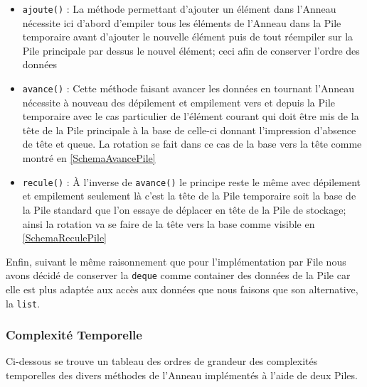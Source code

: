 \documentclass{article}
\newcommand{\info}{\texttt}
\begin{document}
        \begin{itemize}
            \item \info{ajoute()} : La méthode permettant d'ajouter un élément dans l'Anneau nécessite ici d'abord d'empiler tous les éléments de l'Anneau dans la Pile temporaire avant d'ajouter le nouvelle élément puis de tout réempiler sur la Pile principale par dessus le nouvel élément; ceci afin de conserver l'ordre des données
            \item \info{avance()} : Cette méthode faisant avancer les données en tournant l'Anneau nécessite à nouveau des dépilement et empilement vers et depuis la Pile temporaire avec le cas particulier de l'élément courant qui doit être mis de la tête de la Pile principale à la base de celle-ci donnant l'impression d'absence de tête et queue. La rotation se fait dans ce cas de la base vers la tête comme montré en \ref{SchemaAvancePile}
            \item \info{recule()} : \`A l'inverse de \info{avance()} le principe reste le même avec dépilement et empilement seulement là c'est la tête de la Pile temporaire soit la base de la Pile standard que l'on essaye de déplacer en tête de la Pile de stockage; ainsi la rotation va se faire de la tête vers la base comme visible en \ref{SchemaReculePile}
        \end{itemize}
        Enfin, suivant le même raisonnement que pour l'implémentation par File nous avons décidé de conserver la \info{deque} comme container des données de la Pile car elle est plus adaptée aux accès aux données que nous faisons que son alternative, la \info{list}.
        
        \subsubsection{Complexité Temporelle}
        
        Ci-dessous se trouve un tableau des ordres de grandeur des complexités temporelles des divers méthodes de l'Anneau implémentés à l'aide de deux Piles.
        
\end{document}
